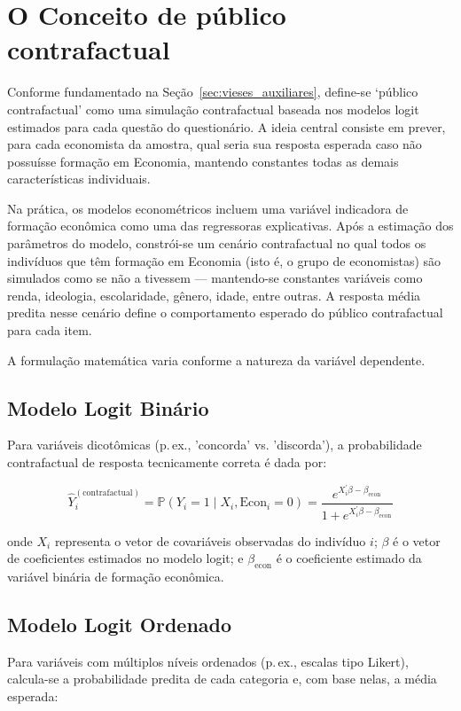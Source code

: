 \section{O Conceito de público contrafactual}
\label{sec:publico_esclarecido}

Conforme fundamentado na Seção~\ref{sec:vieses_auxiliares}, define-se ‘público contrafactual’ como uma simulação contrafactual baseada nos modelos logit estimados para cada questão do questionário. A ideia central consiste em prever, para cada economista da amostra, qual seria sua resposta esperada caso não possuísse formação em Economia, mantendo constantes todas as demais características individuais.

Na prática, os modelos econométricos incluem uma variável indicadora de formação econômica como uma das regressoras explicativas. Após a estimação dos parâmetros do modelo, constrói-se um cenário contrafactual no qual todos os indivíduos que têm formação em Economia (isto é, o grupo de economistas) são simulados como se não a tivessem — mantendo-se constantes variáveis como renda, ideologia, escolaridade, gênero, idade, entre outras. A resposta média predita nesse cenário define o comportamento esperado do público contrafactual para cada item.

A formulação matemática varia conforme a natureza da variável dependente.

\subsection{Modelo Logit Binário}

Para variáveis dicotômicas (p.\,ex., 'concorda' vs. 'discorda'), a probabilidade contrafactual de resposta tecnicamente correta é dada por:

\[
\hat{Y}_i^{(\text{contrafactual})} = \mathbb{P}(Y_i = 1 \mid X_i, \text{Econ}_i = 0) = \frac{e^{X_i^\prime \beta - \beta_{\text{econ}}}}{1 + e^{X_i^\prime \beta - \beta_{\text{econ}}}}
\]

\noindent onde $X_i$ representa o vetor de covariáveis observadas do indivíduo $i$; $\beta$ é o vetor de coeficientes estimados no modelo logit; e $\beta_{\text{econ}}$ é o coeficiente estimado da variável binária de formação econômica.

\subsection{Modelo Logit Ordenado}

Para variáveis com múltiplos níveis ordenados (p.\,ex., escalas tipo Likert), calcula-se a probabilidade predita de cada categoria e, com base nelas, a média esperada:


